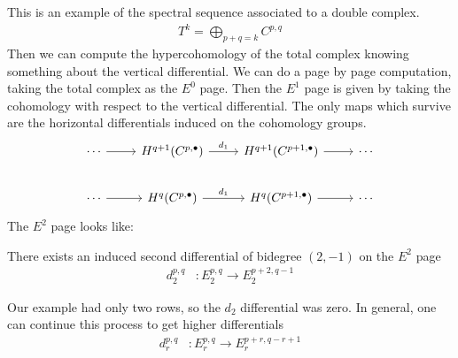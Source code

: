\documentclass[12pt]{article}
\begin{document}
This is an example of the spectral sequence associated to a double complex. \begin{align*}
    T^k = \bigoplus_{p+q=k} C^{p,q}
\end{align*} Then we can compute the hypercohomology of the total complex knowing something about the vertical differential. We can do a page by page computation, taking the total complex as the $E^0$ page. Then the $E^1$ page is given by taking the cohomology with respect to the vertical differential. The only maps which survive are the horizontal differentials induced on the cohomology groups. 
\[
\begin{tikzcd}[row sep=2em]
    \cdots \arrow[r] & H^{q+1}(C^{p,\bullet}) \arrow[r, "d_1"] & H^{q+1}(C^{p+1,\bullet}) \arrow[r] & \cdots \\
    \cdots \arrow[r] & H^q(C^{p,\bullet}) \arrow[r, "d_1"] & H^q(C^{p+1,\bullet}) \arrow[r] & \cdots
\end{tikzcd}
\]
The $E^2$ page looks like:
\begin{center}
\end{center}
\begin{theorem}
    There exists an induced second differential of bidegree $(2,-1)$ on the $E^2$ page \begin{align*}
        d_2^{p,q} & : E_2^{p,q} \to E_2^{p+2,q-1}
    \end{align*}
\end{theorem}
Our example had only two rows, so the $d_2$ differential was zero. In general, one can continue this process to get higher differentials \begin{align*}
    d_r^{p,q} & : E_r^{p,q} \to E_r^{p+r,q-r+1}
\end{align*} 
\end{document}
